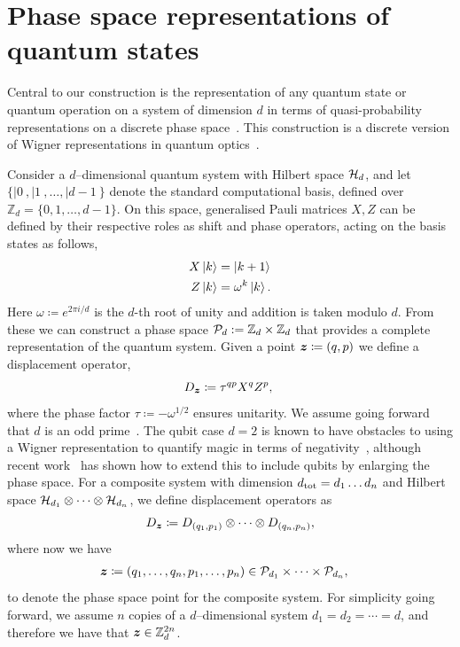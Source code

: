 \documentclass[pra,
aps,
twocolumn,
superscriptaddress,
groupedaddress,
nofootinbib,
reprint
]{revtex4-1}
\begin{document}
\section{Phase space representations of quantum states}
\label{sec:ps}

Central to our construction is the representation of any quantum state or quantum operation on a system of dimension $d$ in terms of quasi-probability representations on a discrete phase space~\cite{Ferrie_2008}. This construction is a discrete version of Wigner representations in quantum optics~\cite{Wigner_1932, Vourdas_2004}.

Consider a $d$--dimensional quantum system with Hilbert space $\H_d$, and let $\{ |0\>, |1\>, \dots , |d-1\>\}$ denote the standard computational basis, defined over $\mathbb{Z}_d = \{ 0, 1, \dots,d-1 \}$. On this space, generalised Pauli matrices $X, Z$ can be defined by their respective roles as shift and phase operators, acting on the basis states as follows,
\begin{align}
    X \ket{k} &= \ket{k + 1} \label{eq:xpauli}\\
	Z \ket{k} &= \omega^k \ket{k}. \label{eq:zpauli}
\end{align}
Here $\omega \coloneqq e^{2\pi i/d}$ is the $d$-th root of unity and addition is taken modulo $d$. From these we can construct a phase space $\cal{P}_d := \mathbb{Z}_d \times \mathbb{Z}_d$ that provides a complete representation of the quantum system. Given a point $\bmz \coloneqq (q, p)$ we define a displacement operator, 
\begin{equation}\label{eq:ddef}
    D_{\bmz} \coloneqq \tau^{q p} X^{q} Z^{p},\ 
\end{equation}
where the phase factor $\tau \coloneqq -\omega^{1/2}$ ensures unitarity. We assume going forward that $d$ is an odd prime~\cite{Appleby_2005}. The qubit case $d=2$ is known to have obstacles to using a Wigner representation to quantify magic in terms of negativity~\cite{Mermin_1990, cit:howard2}, although recent work~\cite{Raussendorf_qubits} has shown how to extend this to include qubits by enlarging the phase space. For a composite system with dimension $d_{\rm tot} = d_1 \dots d_n$ and Hilbert space $\cal{H}_{d_1} \otimes \dots \otimes \cal{H}_{d_n}$, we define displacement operators as
\begin{equation}\label{eq:composited}
    D_{\bmz} \coloneqq D_{(q_1, p_1)} \otimes \dots \otimes D_{(q_n, p_n)},
\end{equation}
where now we have
\begin{align*}
	\bmz &\coloneqq (q_1, \dots, q_n, p_1, \dots, p_n) \in \cal{P}_{d_1} \times \dots \times \cal{P}_{d_n},
\end{align*}
to denote the phase space point for the composite system. 
For simplicity going forward, we assume $n$ copies of a $d$--dimensional system $d_1=d_2 = \cdots = d$, and therefore we have that $\bmz \in \mathbb{Z}_d^{2n}$.
\end{document}
